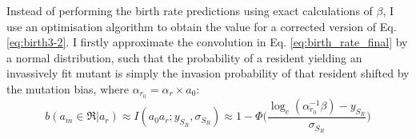 \documentclass[a4paper]{report}
\DeclareMathOperator{\log}{log}
\begin{document}
{%
%  
%
%   

Instead of performing the birth rate predictions using exact calculations of $\beta$, I use an optimisation algorithm to obtain the value for a corrected version of Eq. \eqref{eq:birth3-2}. I firstly approximate the convolution in Eq. \eqref{eq:birth_rate_final} by a normal distribution, such that the probability of a resident yielding an invassively fit mutant is simply the invasion probability of that resident shifted by the mutation bias, where $\alpha_r_0=\alpha_r \times a_0$:
\begin{equation}
b(a_{m}\in\Re|a_{r})\approx I(a_{0}a_{r};y_{S_{R}},\sigma_{S_{R}})\approx1-\Phi\Bigg(\frac{\log_{e}(\alpha_{r_{0}}^{-1}\beta)-y_{S_{R}}}{\sigma_{S_{R}}}\Bigg)\label{eq:birth3_full_corrected}
\end{equation}

}
\end{document}
